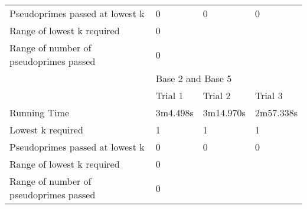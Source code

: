 \documentclass{article}
\begin{document}
\begin{appendices}
\begin{table}[h]
\begin{tabular}{@{}llll@{}}
Pseudoprimes passed at lowest k        & 0           & 0          & 0          \\\cmidrule(lr){2-4}
Range of lowest k required             & \multicolumn{3}{l}{0}                 \\
Range of number of pseudoprimes passed & \multicolumn{3}{l}{0}                 \\\midrule
                                       & \multicolumn{3}{l}{Base 2 and Base 5} \\\midrule
                                       & Trial 1     & Trial 2    & Trial 3    \\
Running Time                           & 3m4.498s    & 3m14.970s  & 2m57.338s  \\
Lowest k required                      & 1           & 1          & 1          \\
Pseudoprimes passed at lowest k        & 0           & 0          & 0          \\\cmidrule(lr){2-4}
Range of lowest k required             & \multicolumn{3}{l}{0}                 \\
Range of number of pseudoprimes passed & \multicolumn{3}{l}{0}                 \\ \bottomrule
\end{tabular}
\end{table}
\FloatBarrier

\end{appendices}
\end{document}

